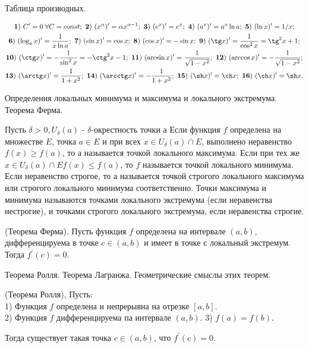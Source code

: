 \newpage

\begin{problem}
Таблица производных.
\end{problem}
\begin{multline*}
    {\bf 1)} \ C'=0\;\forall C=const; \ {\bf 2)} \ (x^{\alpha})'=
    \alpha x^{\alpha-1}; \ {\bf 3)} \ (e^x)'=e^x; \ {\bf 4)} \ (a^x)'=
    a^x\ln a; \ {\bf 5)} \ (\ln x)'=1/x;\\
    {\bf 6)} \ (\log_a x)'=
    \frac{1}{x\ln a}; \ {\bf 7)} \ (\sin x)'=\cos x; \
    {\bf 8)} \ (\cos x)'=-\sin x; \ {\bf 9)} \ (\tg x)'=
    \frac{1}{\cos^2x}=\tg^2x+1;\\
    {\bf 10)} \ (\ctg x)'=-\frac{1}{\sin^2x}=-\ctg^2x-1; \
    {\bf 11)} \ (\arcsin x)'=\frac{1}{\sqrt{1-x^2}}; \
    {\bf 12)} \ (\arccos x)'=-\frac{1}{\sqrt{1-x^2}};\\
    {\bf 13)} \ (\arctg x)'=\frac{1}{1+x^2}; \
    {\bf 14)} \ (\arcctg x)'=-\frac{1}{1+x^2}; \
    {\bf 15)} \ (\sh x)'=\ch x; \
    {\bf 16)} \ (\ch x)'=\sh x.
\end{multline*}

\newpage

\begin{problem}
Определения локальных минимума и максимума и локального экстремума. Теорема
Ферма.
\end{problem}
\begin{definition}
    Пусть $\delta>0, U_\delta(a)$ - $\delta$-окрестность точки а Если функция $f$ определена на множестве $E$, точка $a \in E$ и при всех $x \in U_\delta(a) \cap E$, выполнено неравенство $f(x) \geq f(a)$, то а называется точкой локального максимума. Если при тех же $x \in U_\delta(a) \cap E f(x) \leq f(a)$, то $f$ называется точкой локального минимума. Если неравенство строгое, то а называется точкой строгого локального максимума или строгого локального минимума соответственно. Точки максимума и минимума называются точками локального экстремума (если неравенства нестрогие), и точками строгого локального экстремума, если неравенства строгие.
\end{definition}

\begin{theorem}
    (Теорема Ферма). Пусть функция $f$ определена на интервале $(a, b)$, дифференцируема в точке $c \in(a, b)$ и имеет в точке с локальный экстремум. Тогда $f^{\prime}(c)=0$.
\end{theorem}


\newpage

\begin{problem}
Теорема Ролля. Теорема Лагранжа. Геометрические смыслы этих теорем.
\end{problem}
\begin{theorem}
    (Теорема Ролля), Пусть:\\
    1) Функция $f$ определена и непрерывна на отрезке $[a, b]$.\\
    2) Функция $f$ дифференцируема па интервале $(a, b)$.
    3) $f(a)=f(b)$.

    Тогда существует такая точка $c \in(a, b)$, что $f^{\prime}(c)=0$.
\end{theorem}


